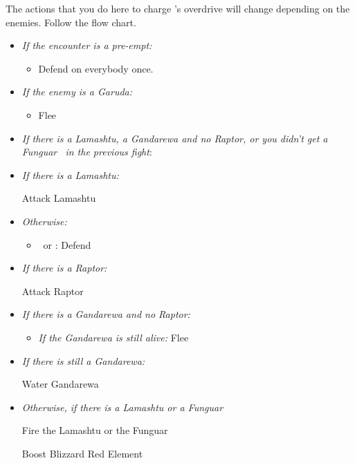 \begin{encounters}
	The actions that you do here to charge \valefor's overdrive will change depending on the enemies. Follow the flow chart.
	\begin{itemize}
		\item \textit{If the encounter is a pre-empt:}
		\begin{itemize}
			\item Defend on everybody once.
		\end{itemize}
		\item \textit{If the enemy is a Garuda:}
		\begin{itemize}
			\item Flee
		\end{itemize}
		\item \textit{If there is a Lamashtu, a Gandarewa and no Raptor, or you didn't get a Funguar \od\ in the previous fight}:
		\begin{itemize}
			\switch{\tidus}{\kimahri}
		\end{itemize}
		\item \textit{If there is a Lamashtu:}
		\begin{itemize}
			\kimahrif Attack Lamashtu
		\end{itemize}
		\item \textit{Otherwise:}
		\begin{itemize}
			\item \kimahri\ or \tidus: Defend
		\end{itemize}
		\item \textit{If there is a Raptor:}
		\begin{itemize}
			\wakkaf Attack Raptor
		\end{itemize}
		\item \textit{If there is a Gandarewa and no Raptor:}
		\begin{itemize}
			\kimahrif Lancet Gandarewa \textit{If you didn't attack a Lamashtu}
			\wakkaf Attack Gandarewa
			\item \textit{If the Gandarewa is still alive:} Flee
		\end{itemize}
		\switch{\auron}{\yuna}
		\summon{\valefor}
		\item \textit{If there is still a Gandarewa:}
		\begin{itemize}
			\valeforf Water Gandarewa
		\end{itemize}
		\item \textit{Otherwise, if there is a Lamashtu or a Funguar}
		\begin{itemize}
			\valeforf Fire the Lamashtu or the Funguar
		\end{itemize}
		\valeforf Boost
		\valeforf Blizzard Red Element
	\end{itemize}
\end{encounters}
